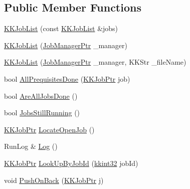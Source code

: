 \subsection*{Public Member Functions}
\begin{DoxyCompactItemize}
\item 
\hyperlink{class_k_k_job_managment_1_1_k_k_job_list_aab69855fcb08e42e5dd767b010ec8549}{K\+K\+Job\+List} (const \hyperlink{class_k_k_job_managment_1_1_k_k_job_list}{K\+K\+Job\+List} \&jobs)
\item 
\hyperlink{class_k_k_job_managment_1_1_k_k_job_list_acb76a08cf6de6a8869bc3c2a1fa3749c}{K\+K\+Job\+List} (\hyperlink{namespace_k_k_job_managment_aa12a7270f9983ca4ed916533dc8adbc4}{Job\+Manager\+Ptr} \+\_\+manager)
\item 
\hyperlink{class_k_k_job_managment_1_1_k_k_job_list_a80929cf1fc09e22028f55944cf3b9c4d}{K\+K\+Job\+List} (\hyperlink{namespace_k_k_job_managment_aa12a7270f9983ca4ed916533dc8adbc4}{Job\+Manager\+Ptr} \+\_\+manager, K\+K\+Str \+\_\+file\+Name)
\item 
bool \hyperlink{class_k_k_job_managment_1_1_k_k_job_list_a95fbdd94a31de57b5f6b8967b9656025}{All\+Prequisites\+Done} (\hyperlink{namespace_k_k_job_managment_a852ed63ebf0c5655d281b510dfb34484}{K\+K\+Job\+Ptr} job)
\item 
bool \hyperlink{class_k_k_job_managment_1_1_k_k_job_list_ac7fdaae91630dc2ff2f9657eb1d02899}{Are\+All\+Jobs\+Done} ()
\item 
bool \hyperlink{class_k_k_job_managment_1_1_k_k_job_list_a887c6fe24402c380445f4b89fa952966}{Jobs\+Still\+Running} ()
\item 
\hyperlink{namespace_k_k_job_managment_a852ed63ebf0c5655d281b510dfb34484}{K\+K\+Job\+Ptr} \hyperlink{class_k_k_job_managment_1_1_k_k_job_list_aec27e5f2ba092ad93e80c81bb8ea45e5}{Locate\+Open\+Job} ()
\item 
Run\+Log \& \hyperlink{class_k_k_job_managment_1_1_k_k_job_list_a8c3bf903379fa17b7cb88ab41142bb0d}{Log} ()
\item 
\hyperlink{namespace_k_k_job_managment_a852ed63ebf0c5655d281b510dfb34484}{K\+K\+Job\+Ptr} \hyperlink{class_k_k_job_managment_1_1_k_k_job_list_ac394872bccd2a9a21833b7a86dc12165}{Look\+Up\+By\+Job\+Id} (\hyperlink{namespace_k_k_b_a8fa4952cc84fda1de4bec1fbdd8d5b1b}{kkint32} job\+Id)
\item 
void \hyperlink{class_k_k_job_managment_1_1_k_k_job_list_abdf9dda2d50a190862d0d82e6597494d}{Push\+On\+Back} (\hyperlink{namespace_k_k_job_managment_a852ed63ebf0c5655d281b510dfb34484}{K\+K\+Job\+Ptr} j)
\end{DoxyCompactItemize}



